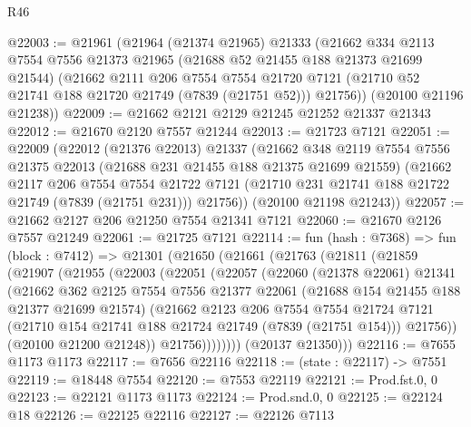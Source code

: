 \begin{lexlean}{R46}
\begin{coremodule}
@22003 := @21961
    (@21964
      (@21374 @21965)
      @21333
      (@21662
        @334
        @2113
        @7554
        @7556
        @21373
        @21965
        (@21688 @52 @21455 @188 @21373 @21699 @21544)
        (@21662
          @2111
          @206
          @7554
          @7554
          @21720
          @7121
          (@21710 @52 @21741 @188 @21720 @21749 (@7839 (@21751 @52)))
          @21756))
      (@20100 @21196 @21238))
@22009 := @21662 @2121 @2129 @21245 @21252 @21337 @21343
@22012 := @21670 @2120 @7557 @21244
@22013 := @21723 @7121
@22051 := @22009
    (@22012
      (@21376 @22013)
      @21337
      (@21662
        @348
        @2119
        @7554
        @7556
        @21375
        @22013
        (@21688 @231 @21455 @188 @21375 @21699 @21559)
        (@21662
          @2117
          @206
          @7554
          @7554
          @21722
          @7121
          (@21710 @231 @21741 @188 @21722 @21749 (@7839 (@21751 @231)))
          @21756))
      (@20100 @21198 @21243))
@22057 := @21662 @2127 @206 @21250 @7554 @21341 @7121
@22060 := @21670 @2126 @7557 @21249
@22061 := @21725 @7121
@22114 := fun (hash : @7368) =>
  fun (block : @7412) =>
  @21301
    (@21650
      (@21661
        (@21763
          (@21811
            (@21859
              (@21907
                (@21955
                  (@22003
                    (@22051
                      (@22057
                        (@22060
                          (@21378 @22061)
                          @21341
                          (@21662
                            @362
                            @2125
                            @7554
                            @7556
                            @21377
                            @22061
                            (@21688 @154 @21455 @188 @21377 @21699 @21574)
                            (@21662
                              @2123
                              @206
                              @7554
                              @7554
                              @21724
                              @7121
                              (@21710 @154 @21741 @188 @21724 @21749 (@7839 (@21751 @154)))
                              @21756))
                          (@20100 @21200 @21248))
                        @21756))))))))
        (@20137 @21350)))
@22116 := @7655 @1173 @1173
@22117 := @7656 @22116
@22118 := (state : @22117) -> @7551
@22119 := @18448 @7554
@22120 := @7553 @22119
@22121 := Prod.fst.{0, 0}
@22123 := @22121 @1173 @1173
@22124 := Prod.snd.{0, 0}
@22125 := @22124 @18
@22126 := @22125 @22116
@22127 := @22126 @7113

\end{coremodule}
\end{lexlean}
